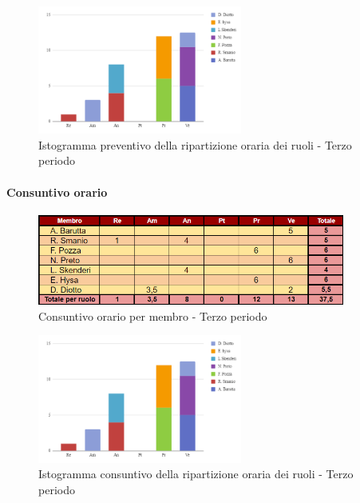 \vspace{0.4cm}

\begin{figure}[H]
    \centering
    \includegraphics[width=0.6\textwidth]{../Images/preventivoDivisioneRuoli3Periodo.png}
    \caption{Istogramma preventivo della ripartizione oraria dei ruoli - Terzo periodo}
    \label{fig:Preventivo_ripartizione_oraria_3}
\end{figure}

\paragraph{Consuntivo orario} 

\begin{figure}[H]
    \centering
    \includegraphics[width=0.9\textwidth]{../Images/consuntivoOrario3Periodo.png}
    \caption{Consuntivo orario per membro - Terzo periodo}
    \label{fig:Constuntivo_orario_3}
\end{figure}

\vspace{0.6cm}

\begin{figure}[H]
    \centering
    \includegraphics[width=0.6\textwidth]{../Images/consuntivoDivisioneRuoli3Periodo.png}
    \caption{Istogramma consuntivo della ripartizione oraria dei ruoli - Terzo periodo}
    \label{fig:Consuntivo_ripartizione_oraria_3}
\end{figure}


